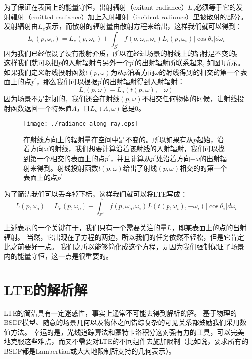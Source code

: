 \documentclass[a4paper]{article}
\begin{document}
	为了保证在表面上的能量守恒，出射辐射（exitant radiance）$L_o$必须等于它的发射辐射（emitted radiance）加上入射辐射（incident radiance）里被散射的部分。发射辐射由$L_e$表示，而散射的辐射量由散射方程来给出，这样我们就可以得到：
	\begin{equation*}
			L_o(p, \omega_o) = L_e(p,\omega_o)+\int_{S^2}f(p, \omega_o,\omega_i)L_i(p, \omega_i)|\cos\theta_i|d\omega_i
	\end{equation*}
	因为我们已经假设了没有散射介质，所以在经过场景的射线上的辐射是不变的。
	这样我们就可以把$p$的入射辐射与另外一个$p^\prime$的出射辐射所联系起来, 如图\ref{fig:radiance-along-ray}所示。
	如果我们定义射线投射函数$t(p, \omega)$为从$p$沿着方向$\omega$的射线得到的相交的第一个表面上的点$p^\prime$，那么我们可以根据$p^\prime$的出射辐射得到入射辐射：
	\begin{equation*}
		L_i(p,\omega)=L_o(t(p,\omega), -\omega)
	\end{equation*}
	因为场景不是封闭的，我们还会在射线$(p,\omega)$不相交任何物体的时候，让射线投射函数返回一个特殊值$\Lambda$，且$L_o(\Lambda,\omega)$总是$0$。
	\begin{figure}[h!]
		\begin{framed}
		\texttt{[image: ./radiance-along-ray.eps]}
		\caption{在射线方向上的辐射量在空间中是不变的。所以如果有从$p$起始，沿着方向$\omega$的射线，我们想要计算沿着该射线的入射辐射，我们可以找到第一个相交的表面上的点$p^\prime$，并且计算从$p^\prime$处沿着方向$-\omega$的出射辐射来得到。射线投射函数$t(p,\omega)$给出了射线$(p,\omega)$相交的的第一个表面上的点$p^\prime$}
		\label{fig:radiance-along-ray}
		\end{framed}
	\end{figure}

	为了简洁我们可以丢弃掉下标，这样我们就可以将LTE写成：
	\begin{equation}
		L(p, \omega_o)=L_e(p, \omega_o)+\int_{S^2}f(p,\omega_o,\omega_i)L(t(p, \omega_i),-\omega_i)|\cos\theta_i|d\omega_i
		\label{eq:dir-int}
	\end{equation}
	
	上述表示的一个关键在于，我们只有一个需要关注的量$L$，即某表面上的点的出射辐射。
	当然，它出现在了方程的两边，所以我们的任务依然不轻松，但是它肯定比之前要好一点。
	我们之所以能够简化成这个方程，是因为我们强制保证了场景内的能量守恒，这一点是很重要的。
	
	\section{LTE的解析解}
	LTE的简洁具有一定迷惑性，事实上通常不可能去得到解析的解。
	基于物理的BSDF模型、随意的场景几何以及物体之间错综复杂的可见关系都鼓励我们采用数值方法。
	幸运的是，光线追踪算法和蒙特卡洛积分这对强有力的工具，可以完美地克服这些难点，而又不需要对LTE的不同组件去施加限制（比如说，要求所有的BSDF都是Lambertian或大大地限制所支持的几何表示）。
	
\end{document}
